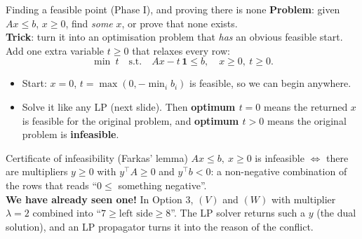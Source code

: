 \documentclass[aspectratio=169,11pt]{beamer}
\begin{document}
\begin{frame}{Finding a feasible point (Phase I), and proving there is none}
\footnotesize
\textbf{Problem}: given $Ax \le b$, $x \ge 0$, find \emph{some} $x$, or prove that none exists.\\[1mm]
\textbf{Trick}: turn it into an optimisation problem that \emph{has} an obvious feasible start. Add one extra variable $t \ge 0$
that relaxes every row:
\[
\min\ t \quad\text{s.t.}\quad Ax - t\,\mathbf{1} \le b,\quad x \ge 0,\ t \ge 0 .
\]
\begin{itemize}\setlength\itemsep{2pt}
\item Start: $x = 0$, $t = \max(0, -\min_i b_i)$ is feasible, so we can begin anywhere.
\item Solve it like any LP (next slide). Then \textbf{optimum $t = 0$} means the returned $x$ is feasible for the original
  problem, and \textbf{optimum $t > 0$} means the original problem is \textbf{infeasible}.
\end{itemize}
\vspace{1mm}
\begin{block}{Certificate of infeasibility (Farkas' lemma)}
$Ax \le b,\ x\ge 0$ is infeasible $\iff$ there are multipliers $y \ge 0$ with $y^{\top}\!A \ge 0$ and $y^{\top} b < 0$:
a non-negative combination of the rows that reads ``$0 \le$ something negative''.\\[1mm]
\textbf{We have already seen one!} In Option 3, $(V)$ and $(W)$ with multiplier $\lambda = 2$ combined into
``$7 \ge \text{left side} \ge 8$''. The LP solver returns such a $y$ (the dual solution), and an LP propagator turns it
into the reason of the conflict.
\end{block}
\end{frame}
\end{document}
